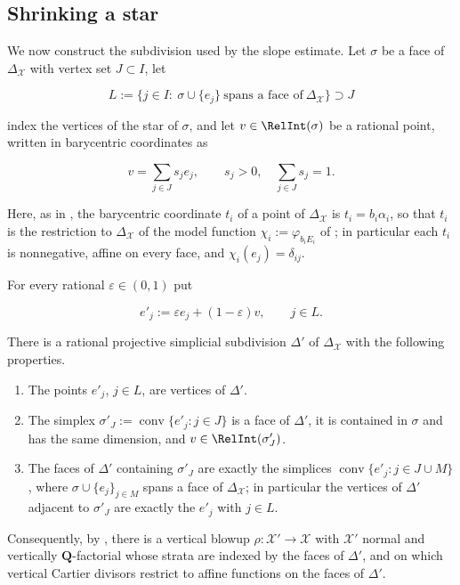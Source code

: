 \subsection{Shrinking a star}

We now construct the subdivision used by the slope estimate.  Let $\sigma$
be a face of $\Delta_{\mathcal X}$ with vertex set $J\subset I$, let

\[
 L:=\{j\in I:\ \sigma\cup\{e_j\}\ \text{spans a face of}\
       \Delta_{\mathcal X}\}\supset J
\tag{22.34}\label{eq:ch22-star-index}
\]

index the vertices of the star of $\sigma$, and let $v\in\RelInt(\sigma)$
be a rational point, written in barycentric coordinates as

\[
 v=\sum_{j\in J}s_je_j,
 \qquad s_j>0,\quad\sum_{j\in J}s_j=1 .
\tag{22.35}\label{eq:ch22-barycentric-v}
\]

Here, as in , the barycentric coordinate
$t_i$ of a point of $\Delta_{\mathcal X}$ is
$t_i=b_i\alpha_i$, so that $t_i$ is the restriction to
$\Delta_{\mathcal X}$ of the model function $\chi_i:=\varphi_{b_iE_i}$
of \Cref{prop:vertical-divisor-affine-iso}; in particular each $t_i$ is
nonnegative, affine on every face, and $\chi_i(e_j)=\delta_{ij}$.

\begin{lemma}
\label{lem:ch22-star-shrinking}
For every rational $\varepsilon\in(0,1)$ put

\[
                 e'_j:=\varepsilon e_j+(1-\varepsilon)v,
                 \qquad j\in L .
\tag{22.36}\label{eq:ch22-star-shrink}
\]

There is a rational projective simplicial subdivision $\Delta'$ of
$\Delta_{\mathcal X}$ with the following properties.
\begin{enumerate}
\item\label{itm:ch22-star:vertices} The points $e'_j$, $j\in L$, are
vertices of $\Delta'$.
\item\label{itm:ch22-star:face} The simplex
$\sigma'_J:=\operatorname{conv}\{e'_j:j\in J\}$ is a face of $\Delta'$,
it is contained in $\sigma$ and has the same dimension, and
$v\in\RelInt(\sigma'_J)$.
\item\label{itm:ch22-star:star} The faces of $\Delta'$ containing
$\sigma'_J$ are exactly the simplices
$\operatorname{conv}\{e'_j:j\in J\cup M\}$, where $\sigma\cup\{e_j\}_{j\in
M}$ spans a face of $\Delta_{\mathcal X}$; in particular the vertices of
$\Delta'$ adjacent to $\sigma'_J$ are exactly the $e'_j$ with
$j\in L$.
\end{enumerate}
Consequently, by , there is a vertical blowup
$\rho:\mathcal X'\to\mathcal X$ with $\mathcal X'$ normal and vertically
$\mathbf Q$-factorial whose strata are indexed by the faces of
$\Delta'$, and on which vertical Cartier divisors restrict to affine
functions on the faces of $\Delta'$.
\end{lemma}

